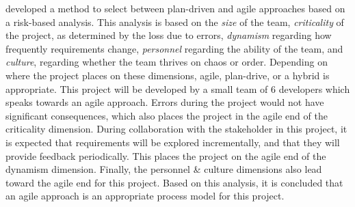  developed a method to select between plan-driven and agile approaches based on a risk-based analysis.
This analysis is based on the \textit{size} of the team, \textit{criticality} of the project, as determined by the loss due to errors, \textit{dynamism} regarding how frequently requirements change, \textit{personnel} regarding the ability of the team, and \textit{culture}, regarding whether the team thrives on chaos or order. 
Depending on where the project places on these dimensions, agile, plan-drive, or a hybrid is appropriate.
This project will be developed by a small team of 6 developers which speaks towards an agile approach. 
Errors during the project would not have significant consequences, which also places the project in the agile end of the criticality dimension.
During collaboration with the stakeholder in this project, it is expected that requirements will be explored incrementally, and that they will provide feedback periodically.
This places the project on the agile end of the dynamism dimension.
Finally, the personnel \& culture dimensions also lead toward the agile end for this project.\cite{boehmObservationsBalancingDiscipline}
Based on this analysis, it is concluded that an agile approach is an appropriate process model for this project.

